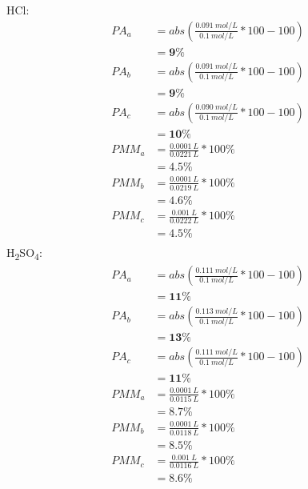 \documentclass[11pt]{report}
\begin{document}
\begin{multicols}{2}
    HCl:\\
    \begin{equation*}
        \begin{split}
            PA_a &= abs(\frac{0.091\ mol/L}{0.1\ mol/L}*100-100)\\
                &= \mathbf{9\%} \\
            PA_b &= abs(\frac{0.091\ mol/L}{0.1\ mol/L}*100-100)\\
                &= \mathbf{9\%} \\
            PA_c &= abs(\frac{0.090\ mol/L}{0.1\ mol/L}*100-100)\\
                &= \mathbf{10\%} \\
            PMM_a &= \frac{0.0001\ L}{0.0221\ L}*100\%\\
                &= \mathbf{4.5\%}\\
            PMM_b &= \frac{0.0001\ L}{0.0219\ L}*100\%\\
                &= \mathbf{4.6\%}\\
            PMM_c &= \frac{0.001\ L}{0.0222\ L}*100\%\\
                &= \mathbf{4.5\%}\\
        \end{split}
    \end{equation*}
\break
    H\textsubscript{2}SO\textsubscript{4}:\\
    \begin{equation*}
        \begin{split}
            PA_a &= abs(\frac{0.111\ mol/L}{0.1\ mol/L}*100-100)\\
                &= \mathbf{11\%} \\
            PA_b &= abs(\frac{0.113\ mol/L}{0.1\ mol/L}*100-100)\\
                &= \mathbf{13\%} \\
            PA_c &= abs(\frac{0.111\ mol/L}{0.1\ mol/L}*100-100)\\
                &= \mathbf{11\%} \\
            PMM_a &= \frac{0.0001\ L}{0.0115\ L}*100\%\\
                &= \mathbf{8.7\%}\\
            PMM_b &= \frac{0.0001\ L}{0.0118\ L}*100\%\\
                &= \mathbf{8.5\%}\\
            PMM_c &= \frac{0.001\ L}{0.0116\ L}*100\%\\
                &= \mathbf{8.6\%}\\
        \end{split}
    \end{equation*}
\end{multicols}
\end{document}
